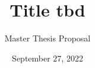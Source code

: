 \title{Title tbd}
\subtitle{Master Thesis \ifdefined\PROPOSAL{} Proposal \fi}
\date{September 27, 2022}
\newcommand{\firstname}{Sascha}
\newcommand{\lastname}{Thiemann}
\newcommand{\matrNo}{406187}
\newcommand{\email}{sascha.thiemann@rwth-aachen.de}
\newcommand{\studyProgram}{Master Computer Science}

\newcommand{\firstsupervisor}{apl. Prof.\ Dr.\ Thomas Noll}
\newcommand{\firstsupervisorchair}{Chair for Software Modeling and Verification}
\newcommand{\firstsupervisoruniversity}{RWTH Aachen University}




